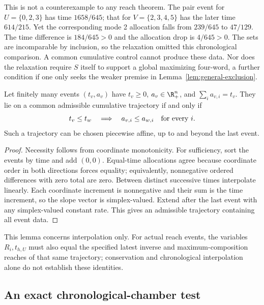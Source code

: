 This is not a counterexample to any reach theorem. The pair event for
$U=\{0,2,3\}$ has time $1658/645$; that for $V=\{2,3,4,5\}$ has
the later time $614/215$. Yet the corresponding mode 2 allocation falls
from $239/645$ to $47/129$. The time difference is $184/645>0$ and
the allocation drop is $4/645>0$. The sets are incomparable by inclusion,
so the relaxation omitted this chronological comparison. A common
cumulative control cannot produce these data. Nor does the relaxation
require $S$ itself to support a global maximizing four-word, a further
condition if one only seeks the weaker premise in
Lemma~\ref{lem:general-exclusion}.

\begin{lemma}\label{lem:event-interpolation}
Let finitely many events $(t_v,a_v)$ have $t_v\ge0$, $a_v\in\R_+^n$,
and $\sum_i a_{v,i}=t_v$. They lie on a common admissible cumulative
trajectory if and only if
\begin{equation}\label{eq:chronological-order}
 t_v\le t_w\quad\Longrightarrow\quad a_{v,i}\le a_{w,i}
                    \quad\hbox{for every }i.
\end{equation}
Such a trajectory can be chosen piecewise affine, up to and beyond the
last event.
\end{lemma}
\begin{proof}
Necessity follows from coordinate monotonicity. For sufficiency, sort the
events by time and add $(0,0)$. Equal-time allocations agree because
coordinate order in both directions forces equality; equivalently,
nonnegative ordered differences with zero total are zero. Between distinct
successive times interpolate linearly. Each coordinate increment is
nonnegative and their sum is the time increment, so the slope vector is
simplex-valued. Extend after the last event with any simplex-valued constant
rate. This gives an admissible trajectory containing all event data.
\end{proof}

This lemma concerns interpolation only. For actual reach events, the
variables $R_i,t_{h,U}$ must also equal the specified latest inverse and
maximum-composition reaches of that same trajectory; conservation and
chronological interpolation alone do not establish these identities.

\subsection{An exact chronological-chamber test}\label{subsec:chronological-test}

